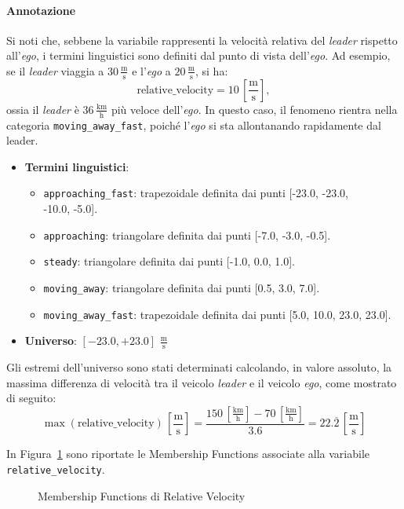 \paragraph{Annotazione} Si noti che, sebbene la variabile rappresenti la velocità relativa del \emph{leader} rispetto all'\emph{ego}, 
i termini linguistici sono definiti dal punto di vista dell'\emph{ego}. Ad esempio, se il \emph{leader} viaggia a $30\,\frac{\mathrm{m}}{\mathrm{s}}$ e 
l'\emph{ego} a $20\,\frac{\mathrm{m}}{\mathrm{s}}$, si ha:
\[
\text{relative\_velocity} = 10\,\left[\frac{\mathrm{m}}{\mathrm{s}}\right],
\]
ossia il \emph{leader} è $36\,\frac{\mathrm{km}}{\mathrm{h}}$ più veloce dell'\emph{ego}. In questo caso, il fenomeno rientra nella categoria 
\texttt{moving\_away\_fast}, poiché l'\emph{ego} si sta allontanando rapidamente dal leader.
\begin{itemize}
  \item \textbf{Termini linguistici}:
    \begin{itemize}
      \item \texttt{approaching\_fast}: trapezoidale definita dai punti [-23.0, -23.0, \\ -10.0, -5.0].
      \item \texttt{approaching}: triangolare definita dai punti [-7.0, -3.0, -0.5].
      \item \texttt{steady}: triangolare definita dai punti [-1.0, 0.0, 1.0].
      \item \texttt{moving\_away}: triangolare definita dai punti [0.5, 3.0, 7.0].
      \item \texttt{moving\_away\_fast}: trapezoidale definita dai punti [5.0, 10.0, 23.0, 23.0].
    \end{itemize}
  \item \textbf{Universo}: \([-23.0,+23.0]\) $\frac{\mathrm{m}}{\mathrm{s}}$
\end{itemize}
Gli estremi dell'universo sono stati determinati calcolando, in valore assoluto, la massima differenza di velocità tra il veicolo
\emph{leader} e il veicolo \emph{ego}, come mostrato di seguito:
\[
  \max(\text{relative\_velocity}) \,\left[\frac{\mathrm{m}}{\mathrm{s}}\right]
  = \frac{150\,\left[\frac{\mathrm{km}}{\mathrm{h}}\right] - 70\,\left[\frac{\mathrm{km}}{\mathrm{h}}\right]}{3.6}
  = 22.\overline{2}\,\left[\frac{\mathrm{m}}{\mathrm{s}}\right]
\]

\noindent In Figura~\ref{Fig:mf_relative_velocity} sono riportate le Membership Functions associate alla variabile \texttt{relative\_velocity}.
\begin{figure}[H]
    \centering
    \caption{Membership Functions di Relative Velocity}
    \label{Fig:mf_relative_velocity}
\end{figure}

